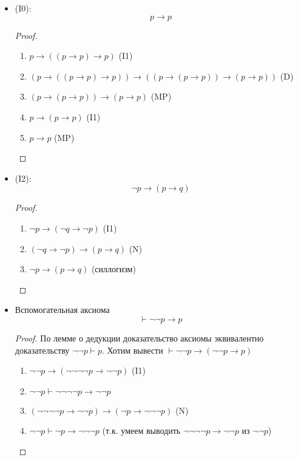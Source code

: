 \documentclass[12pt]{article}
\let\im\rightarrow
\let\n\neg
\theoremstyle{definition}
\theoremstyle{plain}
\theoremstyle{remark}
\begin{document}
\begin{itemize}
  \item (I0):
    \[
      p \im p
    \]
    \begin{proof}
      \begin{enumerate}
        \item $p \im ((p \im p) \im p)$ (I1)

        \item $(p \im ((p \im p) \im p)) \im ((p \im (p \im p)) \im
          (p \im p))$ (D)

        \item $(p \im (p \im p)) \im (p \im p)$ (MP)

        \item $p \im (p \im p)$ (I1)

        \item $p \im p$ (MP)
      \end{enumerate}
    \end{proof}
  \item (I2):
    \[
      \n p \im (p \im q)
    \]
    \begin{proof}
      \begin{enumerate}
        \item $\n p \im (\n q \im \n p)$ (I1)

        \item $(\n q \im \n p) \im (p \im q)$ (N)

        \item $\n p \im(p \im q)$ (силлогизм)
      \end{enumerate}
    \end{proof}

  \item Вспомогательная аксиома
    \[
      \vdash \n\n p \im p
    \]
    \begin{proof}
      По лемме о дедукции доказательство аксиомы эквивалентно
      доказательству $\n\n p \vdash p$. Хотим вывести $\vdash \n\n p
      \im (\n\n p \im p)$
      \begin{enumerate}
        \item $\n\n p \im (\n\n\n\n p \im \n\n p)$ (I1)

        \item $\n\n p \vdash \n\n\n\n p \im \n\n p$

        \item $(\n\n\n\n p \im \n\n p) \im (\n p \im \n\n\n p)$ (N)

        \item $\n\n p \vdash \n p \im \n\n\n p$ (т.к. умеем выводить
          $\n\n\n\n p \im \n\n p$ из $\n\n p$)


\end{enumerate}
\end{proof}
\end{itemize}
\end{document}
